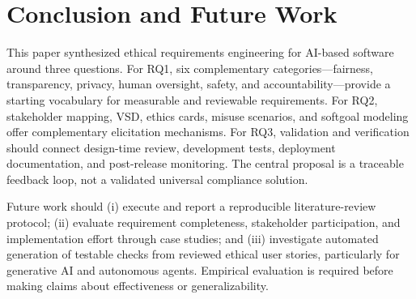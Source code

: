 \documentclass[11pt,a4paper]{article}
\begin{document}
\section{Conclusion and Future Work}
This paper synthesized ethical requirements engineering for AI-based software around three questions. For RQ1, six complementary categories---fairness, transparency, privacy, human oversight, safety, and accountability---provide a starting vocabulary for measurable and reviewable requirements. For RQ2, stakeholder mapping, VSD, ethics cards, misuse scenarios, and softgoal modeling offer complementary elicitation mechanisms. For RQ3, validation and verification should connect design-time review, development tests, deployment documentation, and post-release monitoring. The central proposal is a traceable feedback loop, not a validated universal compliance solution.

Future work should (i) execute and report a reproducible literature-review protocol; (ii) evaluate requirement completeness, stakeholder participation, and implementation effort through case studies; and (iii) investigate automated generation of testable checks from reviewed ethical user stories, particularly for generative AI and autonomous agents. Empirical evaluation is required before making claims about effectiveness or generalizability.
\end{document}
